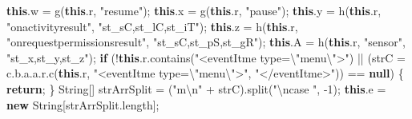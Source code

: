 \documentclass[
]{article}
\newenvironment{Shaded}{}{}
\newcommand{\BuiltInTok}[1]{\textcolor[rgb]{0.00,0.50,0.00}{#1}}
\newcommand{\ControlFlowTok}[1]{\textcolor[rgb]{0.00,0.44,0.13}{\textbf{#1}}}
\newcommand{\DecValTok}[1]{\textcolor[rgb]{0.25,0.63,0.44}{#1}}
\newcommand{\FunctionTok}[1]{\textcolor[rgb]{0.02,0.16,0.49}{#1}}
\newcommand{\KeywordTok}[1]{\textcolor[rgb]{0.00,0.44,0.13}{\textbf{#1}}}
\newcommand{\NormalTok}[1]{#1}
\newcommand{\OperatorTok}[1]{\textcolor[rgb]{0.40,0.40,0.40}{#1}}
\newcommand{\SpecialCharTok}[1]{\textcolor[rgb]{0.25,0.44,0.63}{#1}}
\newcommand{\StringTok}[1]{\textcolor[rgb]{0.25,0.44,0.63}{#1}}
\begin{document}
\begin{Shaded}
\begin{Highlighting}[]
            \KeywordTok{this}\OperatorTok{.}\FunctionTok{w} \OperatorTok{=} \FunctionTok{g}\OperatorTok{(}\KeywordTok{this}\OperatorTok{.}\FunctionTok{r}\OperatorTok{,} \StringTok{"resume"}\OperatorTok{);}
            \KeywordTok{this}\OperatorTok{.}\FunctionTok{x} \OperatorTok{=} \FunctionTok{g}\OperatorTok{(}\KeywordTok{this}\OperatorTok{.}\FunctionTok{r}\OperatorTok{,} \StringTok{"pause"}\OperatorTok{);}
            \KeywordTok{this}\OperatorTok{.}\FunctionTok{y} \OperatorTok{=} \FunctionTok{h}\OperatorTok{(}\KeywordTok{this}\OperatorTok{.}\FunctionTok{r}\OperatorTok{,} \StringTok{"onactivityresult"}\OperatorTok{,} \StringTok{"st\_sC,st\_lC,st\_iT"}\OperatorTok{);}
            \KeywordTok{this}\OperatorTok{.}\FunctionTok{z} \OperatorTok{=} \FunctionTok{h}\OperatorTok{(}\KeywordTok{this}\OperatorTok{.}\FunctionTok{r}\OperatorTok{,} \StringTok{"onrequestpermissionsresult"}\OperatorTok{,} \StringTok{"st\_sC,st\_pS,st\_gR"}\OperatorTok{);}
            \KeywordTok{this}\OperatorTok{.}\FunctionTok{A} \OperatorTok{=} \FunctionTok{h}\OperatorTok{(}\KeywordTok{this}\OperatorTok{.}\FunctionTok{r}\OperatorTok{,} \StringTok{"sensor"}\OperatorTok{,} \StringTok{"st\_x,st\_y,st\_z"}\OperatorTok{);}
            \ControlFlowTok{if} \OperatorTok{(!}\KeywordTok{this}\OperatorTok{.}\FunctionTok{r}\OperatorTok{.}\FunctionTok{contains}\OperatorTok{(}\StringTok{"\textless{}eventItme type=}\SpecialCharTok{\textbackslash{}"}\StringTok{menu}\SpecialCharTok{\textbackslash{}"}\StringTok{\textgreater{}"}\OperatorTok{)} \OperatorTok{||} \OperatorTok{(}\NormalTok{strC }\OperatorTok{=}\NormalTok{ c}\OperatorTok{.}\FunctionTok{b}\OperatorTok{.}\FunctionTok{a}\OperatorTok{.}\FunctionTok{a}\OperatorTok{.}\FunctionTok{r}\OperatorTok{.}\FunctionTok{c}\OperatorTok{(}\KeywordTok{this}\OperatorTok{.}\FunctionTok{r}\OperatorTok{,} \StringTok{"\textless{}eventItme type=}\SpecialCharTok{\textbackslash{}"}\StringTok{menu}\SpecialCharTok{\textbackslash{}"}\StringTok{\textgreater{}"}\OperatorTok{,} \StringTok{"\textless{}/eventItme\textgreater{}"}\OperatorTok{))} \OperatorTok{==} \KeywordTok{null}\OperatorTok{)} \OperatorTok{\{}
                \ControlFlowTok{return}\OperatorTok{;}
            \OperatorTok{\}}
            \BuiltInTok{String}\OperatorTok{[]}\NormalTok{ strArrSplit }\OperatorTok{=} \OperatorTok{(}\StringTok{"m}\SpecialCharTok{\textbackslash{}n}\StringTok{"} \OperatorTok{+}\NormalTok{ strC}\OperatorTok{).}\FunctionTok{split}\OperatorTok{(}\StringTok{"}\SpecialCharTok{\textbackslash{}n}\StringTok{case "}\OperatorTok{,} \OperatorTok{{-}}\DecValTok{1}\OperatorTok{);}
            \KeywordTok{this}\OperatorTok{.}\FunctionTok{e} \OperatorTok{=} \KeywordTok{new} \BuiltInTok{String}\OperatorTok{[}\NormalTok{strArrSplit}\OperatorTok{.}\FunctionTok{length}\OperatorTok{];}

\end{Highlighting}
\end{Shaded}
\end{document}
